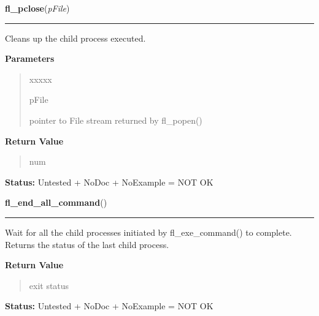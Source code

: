 \hspace{.8\funcindent}\begin{boxedminipage}{\funcwidth}

    \raggedright \textbf{fl\_pclose}(\textit{pFile})

    \vspace{-1.5ex}

    \rule{\textwidth}{0.5\fboxrule}
\setlength{\parskip}{2ex}
    Cleans up the child process executed.

\setlength{\parskip}{1ex}
      \textbf{Parameters}
      \vspace{-1ex}

      \begin{quote}
        \begin{Ventry}{xxxxx}

          \item[pFile]

          pointer to File stream returned by fl\_popen()

        \end{Ventry}

      \end{quote}

      \textbf{Return Value}
    \vspace{-1ex}

      \begin{quote}
      num

      \end{quote}

\textbf{Status:} Untested + NoDoc + NoExample = NOT OK



    \end{boxedminipage}

    \label{xformslib:library:fl_end_all_command}

    \vspace{0.5ex}

\hspace{.8\funcindent}\begin{boxedminipage}{\funcwidth}

    \raggedright \textbf{fl\_end\_all\_command}()

    \vspace{-1.5ex}

    \rule{\textwidth}{0.5\fboxrule}
\setlength{\parskip}{2ex}
    Wait for all the child processes initiated by fl\_exe\_command() to 
    complete. Returns the status of the last child process.

\setlength{\parskip}{1ex}
      \textbf{Return Value}
    \vspace{-1ex}

      \begin{quote}
      exit status

      \end{quote}

\textbf{Status:} Untested + NoDoc + NoExample = NOT OK



    \end{boxedminipage}

